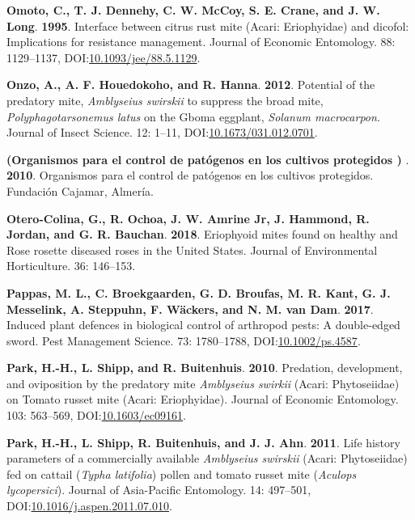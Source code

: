 \documentclass[12pt,final,CPage]{ufthesis}
\newlength{\cslhangindent}
\newenvironment{CSLReferences}[2] %
{%
	\setlength{\parindent}{0pt}
	\ifodd #1 \everypar{\setlength{\hangindent}{\cslhangindent}}\ignorespaces\fi
	\ifnum #2 > 0
	\setlength{\parskip}{#2\baselineskip}
	\fi
}%
{}
\begin{document}
{\begin{CSLReferences}{1}{0}
  \leavevmode{}%
  \textbf{Omoto, C., T. J. Dennehy, C. W. McCoy, S. E. Crane, and J. W. Long}. \textbf{1995}. Interface between citrus rust mite ({Acari}: {Eriophyidae}) and dicofol: Implications for resistance management. Journal of Economic Entomology. 88: 1129--1137, DOI:\href{https://doi.org/10.1093/jee/88.5.1129}{10.1093/jee/88.5.1129}.

  \leavevmode{}%
  \textbf{Onzo, A., A. F. Houedokoho, and R. Hanna}. \textbf{2012}. Potential of the predatory mite, {\emph{Amblyseius swirskii}} to suppress the broad mite, {\emph{Polyphagotarsonemus latus}} on the {Gboma eggplant}, {\emph{Solanum macrocarpon}}. Journal of Insect Science. 12: 1--11, DOI:\href{https://doi.org/10.1673/031.012.0701}{10.1673/031.012.0701}.

  \leavevmode{}%
  \textbf{(Organismos para el control de pat{ó}genos en los cultivos protegidos ) }. \textbf{2010}. Organismos para el control de pat{ó}genos en los cultivos protegidos. Fundaci{ó}n Cajamar, Almer{í}a.

  \leavevmode{}%
  \textbf{Otero-Colina, G., R. Ochoa, J. W. Amrine Jr, J. Hammond, R. Jordan, and G. R. Bauchan}. \textbf{2018}. Eriophyoid mites found on healthy and {Rose rosette diseased} roses in the {United States}. Journal of Environmental Horticulture. 36: 146--153.

  \leavevmode{}%
  \textbf{Pappas, M. L., C. Broekgaarden, G. D. Broufas, M. R. Kant, G. J. Messelink, A. Steppuhn, F. Wäckers, and N. M. van Dam}. \textbf{2017}. Induced plant defences in biological control of arthropod pests: A double-edged sword. Pest Management Science. 73: 1780--1788, DOI:\href{https://doi.org/10.1002/ps.4587}{10.1002/ps.4587}.

  \leavevmode{}%
  \textbf{Park, H.-H., L. Shipp, and R. Buitenhuis}. \textbf{2010}. Predation, development, and oviposition by the predatory mite {\emph{Amblyseius swirkii}} ({Acari}: {Phytoseiidae}) on {Tomato russet mite} ({Acari}: {Eriophyidae}). Journal of Economic Entomology. 103: 563--569, DOI:\href{https://doi.org/10.1603/ec09161}{10.1603/ec09161}.

  \leavevmode{}%
  \textbf{Park, H.-H., L. Shipp, R. Buitenhuis, and J. J. Ahn}. \textbf{2011}. Life history parameters of a commercially available {\emph{Amblyseius swirskii}} ({Acari}: {Phytoseiidae}) fed on cattail ({\emph{Typha latifolia}}) pollen and tomato russet mite ({\emph{Aculops lycopersici}}). Journal of Asia-Pacific Entomology. 14: 497--501, DOI:\href{https://doi.org/10.1016/j.aspen.2011.07.010}{10.1016/j.aspen.2011.07.010}.


\end{CSLReferences}}
\end{document}
